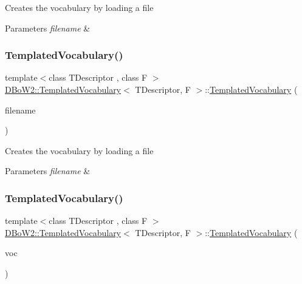 Creates the vocabulary by loading a file 
\begin{DoxyParams}{Parameters}
{\em filename} & \\
\hline
\end{DoxyParams}
\mbox{\label{class_d_bo_w2_1_1_templated_vocabulary_a255d68e7b4235487f8d2d8ea0cbaf43a}} 
\subsubsection{\texorpdfstring{Templated\+Vocabulary()}{TemplatedVocabulary()}\hspace{0.1cm}{\footnotesize\ttfamily [3/4]}}
{\footnotesize\ttfamily template$<$class T\+Descriptor , class F $>$ \\
\mbox{\hyperlink{class_d_bo_w2_1_1_templated_vocabulary}{D\+Bo\+W2\+::\+Templated\+Vocabulary}}$<$ T\+Descriptor, F $>$\+::\mbox{\hyperlink{class_d_bo_w2_1_1_templated_vocabulary}{Templated\+Vocabulary}} (\begin{DoxyParamCaption}\item[{const char $\ast$}]{filename }\end{DoxyParamCaption})}

Creates the vocabulary by loading a file 
\begin{DoxyParams}{Parameters}
{\em filename} & \\
\hline
\end{DoxyParams}
\mbox{\label{class_d_bo_w2_1_1_templated_vocabulary_aac48ee5331b5d88a4db1a3c93cb0f6a5}} 
\subsubsection{\texorpdfstring{Templated\+Vocabulary()}{TemplatedVocabulary()}\hspace{0.1cm}{\footnotesize\ttfamily [4/4]}}
{\footnotesize\ttfamily template$<$class T\+Descriptor , class F $>$ \\
\mbox{\hyperlink{class_d_bo_w2_1_1_templated_vocabulary}{D\+Bo\+W2\+::\+Templated\+Vocabulary}}$<$ T\+Descriptor, F $>$\+::\mbox{\hyperlink{class_d_bo_w2_1_1_templated_vocabulary}{Templated\+Vocabulary}} (\begin{DoxyParamCaption}\item[{const \mbox{\hyperlink{class_d_bo_w2_1_1_templated_vocabulary}{Templated\+Vocabulary}}$<$ T\+Descriptor, F $>$ \&}]{voc }\end{DoxyParamCaption})}

